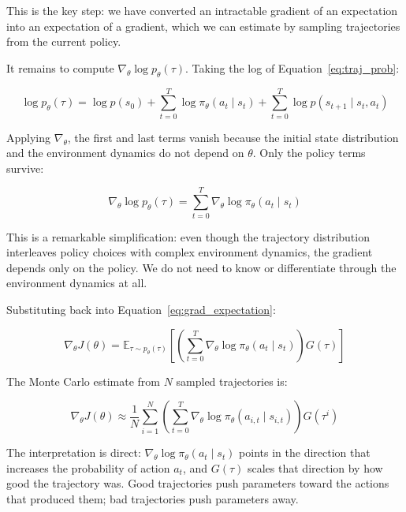 \documentclass{book}
\begin{document}
This is the key step: we have converted an intractable gradient of an
expectation into an expectation of a gradient, which we can estimate by
sampling trajectories from the current policy.

It remains to compute $\nabla_\theta \log p_\theta(\tau)$. Taking the log
of Equation~\ref{eq:traj_prob}:

\begin{equation}
\label{eq:log_traj}
\log p_\theta(\tau) = \log p(s_0)
    + \sum_{t=0}^{T} \log \pi_\theta(a_t \mid s_t)
    + \sum_{t=0}^{T} \log p(s_{t+1} \mid s_t, a_t)
\end{equation}

Applying $\nabla_\theta$, the first and last terms vanish because the
initial state distribution and the environment dynamics do not depend on
$\theta$. Only the policy terms survive:

\begin{equation}
\label{eq:log_traj_grad}
\nabla_\theta \log p_\theta(\tau)
= \sum_{t=0}^{T} \nabla_\theta \log \pi_\theta(a_t \mid s_t)
\end{equation}

This is a remarkable simplification: even though the trajectory
distribution interleaves policy choices with complex environment dynamics,
the gradient depends only on the policy. We do not need to know or
differentiate through the environment dynamics at all.

Substituting back into Equation~\ref{eq:grad_expectation}:

\begin{equation}
\label{eq:policy_gradient}
\nabla_\theta J(\theta)
= \mathbb{E}_{\tau \sim p_\theta(\tau)}\!\left[
    \left(\sum_{t=0}^{T} \nabla_\theta \log \pi_\theta(a_t \mid s_t)\right)
    G(\tau) \right]
\end{equation}

The Monte Carlo estimate from $N$ sampled trajectories is:

\begin{equation}
\label{eq:pg_mc}
\nabla_\theta J(\theta) \approx \frac{1}{N} \sum_{i=1}^{N}
    \left(\sum_{t=0}^{T} \nabla_\theta \log \pi_\theta(a_{i,t} \mid s_{i,t})
    \right) G(\tau^i)
\end{equation}

The interpretation is direct: $\nabla_\theta \log \pi_\theta(a_t \mid s_t)$
points in the direction that increases the probability of action $a_t$,
and $G(\tau)$ scales that direction by how good the trajectory was.
Good trajectories push parameters toward the actions that produced them;
bad trajectories push parameters away.
\end{document}
